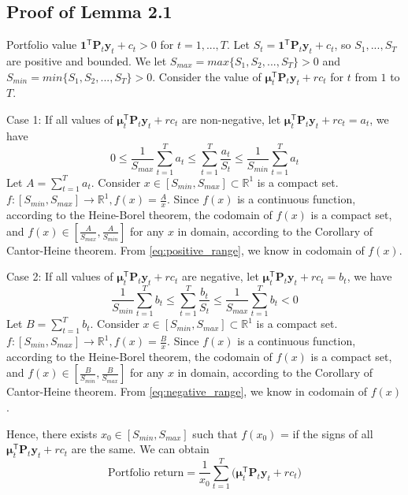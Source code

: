 \subsection*{Proof of Lemma 2.1}
Portfolio value $\mathbf{1}^{\mathsf{T}}\mathbf{P}_t\mathbf{y}_t+c_t>0$ for $t=1,...,T$. Let $S_t=\mathbf{1}^{\mathsf{T}}\mathbf{P}_t\mathbf{y}_t+c_t$, so $S_1,...,S_T$ are positive and bounded. We let $S_{max}=max\{S_1,S_2,...,S_T\}>0$ and $S_{min}=min\{S_1,S_2,...,S_T\}>0$.
Consider the value of $\boldsymbol{\mu}_t^{\mathsf{T}}\mathbf{P}_t \mathbf{y}_t+rc_t$ for $t$ from $1$ to $T$.

Case 1: If all values of $\boldsymbol{\mu}_t^{\mathsf{T}}\mathbf{P}_t \mathbf{y}_t+rc_t$ are non-negative, let $\boldsymbol{\mu}_t^{\mathsf{T}}\mathbf{P}_t \mathbf{y}_t+rc_t=a_t$, we have
\begin{equation}\label{eq:positive_range}
    0\leq\frac{1}{S_{max}}\sum_{t=1}^Ta_t \leq \sum_{t=1}^T\frac{a_t}{S_t} \leq \frac{1}{S_{min}}\sum_{t=1}^Ta_t
\end{equation}
Let $A=\sum_{t=1}^Ta_t$. Consider $x \in [S_{min},S_{max}] \subset \mathbb{R}^1$ is a compact set. $f:[S_{min},S_{max}] \rightarrow \mathbb{R}^1, f(x)=\frac{A}{x}$. Since $f(x)$ is a continuous function, according to the Heine-Borel theorem, the codomain of $f(x)$ is a compact set, and $f(x) \in [\frac{A}{S_{max}},\frac{A}{S_{min}}]$ for any $x$ in domain, according to the Corollary of Cantor-Heine theorem. From \ref{eq:positive_range}, we know  in codomain of $f(x)$. 

Case 2: If all values of $\boldsymbol{\mu}_t^{\mathsf{T}}\mathbf{P}_t \mathbf{y}_t+rc_t$ are negative, let $\boldsymbol{\mu}_t^{\mathsf{T}}\mathbf{P}_t \mathbf{y}_t+rc_t=b_t$, we have
\begin{equation}\label{eq:negative_range}
    \frac{1}{S_{min}}\sum_{t=1}^Tb_t \leq \sum_{t=1}^T\frac{b_t}{S_t} \leq \frac{1}{S_{max}}\sum_{t=1}^Tb_t < 0
\end{equation}
Let $B=\sum_{t=1}^Tb_t$. Consider $x \in [S_{min},S_{max}] \subset \mathbb{R}^1$ is a compact set. $f:[S_{min},S_{max}] \rightarrow \mathbb{R}^1, f(x)=\frac{B}{x}$. Since $f(x)$ is a continuous function, according to the Heine-Borel theorem, the codomain of $f(x)$ is a compact set, and $f(x) \in [\frac{B}{S_{min}},\frac{B}{S_{max}}]$ for any $x$ in domain, according to the Corollary of Cantor-Heine theorem. From \ref{eq:negative_range}, we know  in codomain of $f(x)$. 

Hence, there exists $x_0 \in [S_{min},S_{max}]$ such that $f(x_0)$ =  if the signs of all $\boldsymbol{\mu}_t^{\mathsf{T}}\mathbf{P}_t \mathbf{y}_t+rc_t$ are the same. We can obtain
\begin{equation}
    \text{Portfolio return}=\frac{1}{x_0}\sum_{t=1}^T\Big(\boldsymbol{\mu}_t^{\mathsf{T}}\mathbf{P}_t\mathbf{y}_t+rc_t\Big)
\end{equation}

